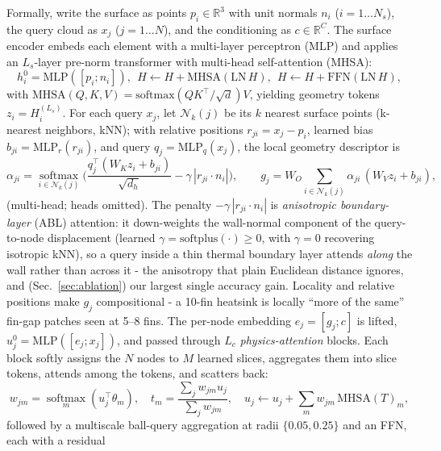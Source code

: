 \documentclass[conference]{IEEEtran}
\begin{document}
Formally, write the surface as points $p_i\in\mathbb{R}^3$ with unit normals $n_i$ ($i{=}1{\dots}N_s$),
the query cloud as $x_j$ ($j{=}1{\dots}N$), and the conditioning as $c\in\mathbb{R}^C$. The surface
encoder embeds each element with a multi-layer perceptron (MLP) and applies an $L_s$-layer pre-norm transformer with multi-head
self-attention (MHSA):
\begin{equation}
h_i^0=\mathrm{MLP}([p_i;n_i]),\ \ H\!\leftarrow\!H+\mathrm{MHSA}(\mathrm{LN}\,H),\ \ H\!\leftarrow\!H+\mathrm{FFN}(\mathrm{LN}\,H),
\end{equation}
with $\mathrm{MHSA}(Q,K,V)=\mathrm{softmax}(QK^\top/\sqrt{d})V$, yielding geometry tokens $z_i=H_i^{(L_s)}$.
For each query $x_j$, let $\mathcal{N}_k(j)$ be its $k$ nearest surface points (k-nearest neighbors, kNN); with relative positions
$r_{ji}=x_j-p_i$, learned bias $b_{ji}=\mathrm{MLP}_r(r_{ji})$, and query $q_j=\mathrm{MLP}_q(x_j)$, the
local geometry descriptor is
\begin{equation}
\alpha_{ji}=\operatorname*{softmax}_{i\in\mathcal{N}_k(j)}\Big(\frac{q_j^\top(W_K z_i+b_{ji})}{\sqrt{d_h}}-\gamma\,|r_{ji}\!\cdot\!n_i|\Big),\qquad
g_j=W_O\!\!\sum_{i\in\mathcal{N}_k(j)}\!\!\alpha_{ji}\,(W_V z_i+b_{ji}),
\end{equation}
(multi-head; heads omitted). The penalty $-\gamma\,|r_{ji}\!\cdot\!n_i|$ is \emph{anisotropic
boundary-layer} (ABL) attention: it down-weights the wall-normal component of the query-to-node
displacement (learned $\gamma=\mathrm{softplus}(\cdot)\ge 0$, with $\gamma=0$ recovering isotropic kNN),
so a query inside a thin thermal boundary layer attends \emph{along} the wall rather than across it - the
anisotropy that plain Euclidean distance ignores, and (Sec.~\ref{sec:ablation}) our largest single accuracy
gain. Locality and relative positions make $g_j$ compositional - a 10-fin heatsink is locally ``more of the
same'' fin-gap patches seen at 5--8 fins. The per-node embedding
$e_j=[g_j;c]$ is lifted, $u_j^0=\mathrm{MLP}([e_j;x_j])$, and passed through $L_c$ \emph{physics-attention}
blocks. Each block softly assigns the $N$ nodes to $M$ learned slices, aggregates them into slice tokens,
attends among the tokens, and scatters back:
\begin{equation}
w_{jm}=\operatorname*{softmax}_m(u_j^\top\theta_m),\quad
t_m=\frac{\sum_j w_{jm}u_j}{\sum_j w_{jm}},\quad
u_j\leftarrow u_j+\sum_m w_{jm}\,\mathrm{MHSA}(T)_m,
\end{equation}
followed by a multiscale ball-query aggregation at radii $\{0.05,0.25\}$ and an FFN, each with a residual
\end{document}
